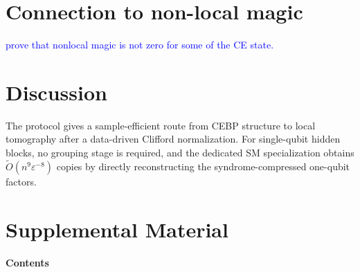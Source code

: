 \documentclass[
  aps,
  prx,
  reprint,
  superscriptaddress,
  amsmath,
  amssymb,
  nofootinbib,
  longbibliography
]{revtex4-2}
\newcommand{\QZ}[1]{{{\textcolor{blue}{#1}}}}
\begin{document}
\section{Connection to non-local magic}

\QZ{prove that nonlocal magic is not zero for some of the CE state.}


\section{Discussion}

The protocol gives a sample-efficient route from CEBP structure to local
tomography after a data-driven Clifford
normalization.  For single-qubit hidden blocks, no grouping stage is required,
and the dedicated SM specialization obtains
$\widetilde O(n^9\varepsilon^{-8})$ copies by directly reconstructing the
syndrome-compressed one-qubit factors.

\clearpage
\onecolumngrid
\appendix

\makeatletter
{}
\makeatother
\setcounter{section}{0}
\setcounter{equation}{0}
\setcounter{theorem}{0}
\setcounter{figure}{0}
\setcounter{table}{0}
\renewcommand{\thesection}{S\arabic{section}}
\renewcommand{\thesubsection}{\thesection.\arabic{subsection}}
\makeatletter
\renewcommand{\p@subsection}{}
\makeatother
\renewcommand{\theequation}{S\arabic{equation}}
\renewcommand{\thetheorem}{S.\arabic{theorem}}
\renewcommand{\thefigure}{S\arabic{figure}}
\renewcommand{\thetable}{S\arabic{table}}
\providecommand{\theHsection}{}
\providecommand{\theHsubsection}{}
\providecommand{\theHequation}{}
\providecommand{\theHtheorem}{}
\providecommand{\theHfigure}{}
\providecommand{\theHtable}{}
\renewcommand{\theHsection}{supp.section.\arabic{section}}
\renewcommand{\theHsubsection}{supp.subsection.\arabic{section}.\arabic{subsection}}
\renewcommand{\theHequation}{supp.equation.\arabic{equation}}
\renewcommand{\theHtheorem}{supp.theorem.\arabic{theorem}}
\renewcommand{\theHfigure}{supp.figure.\arabic{figure}}
\renewcommand{\theHtable}{supp.table.\arabic{table}}

\section*{Supplemental Material}
\makeatletter
\newcommand{\smtocentrytext}[2]{#1\quad #2}
\newcommand{\l@smtocsection}[2]{%
  \par\addvspace{0.32em}%
  \noindent #1\dotfill #2\par
}
\newcommand{\l@smtocsubsection}[2]{%
  \par\addvspace{0.10em}%
  \noindent\hspace*{1.5em}#1\dotfill #2\par
}
\newcommand{\smtableofcontents}{%
  \begingroup
  \small
  \noindent\textbf{Contents}\par\smallskip
  \endgroup
}
\makeatother
\smtableofcontents
\end{document}

